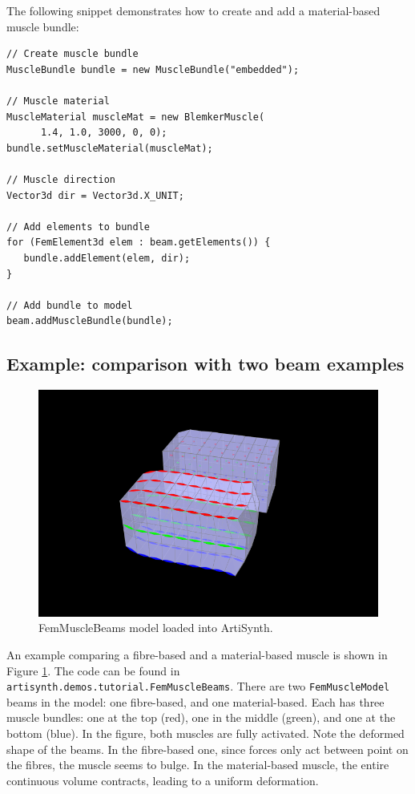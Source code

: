 The following snippet demonstrates how to create and add a material-based
muscle bundle:
\lstset{numbers=left}
\begin{lstlisting}[]
// Create muscle bundle
MuscleBundle bundle = new MuscleBundle("embedded");

// Muscle material
MuscleMaterial muscleMat = new BlemkerMuscle(
      1.4, 1.0, 3000, 0, 0);
bundle.setMuscleMaterial(muscleMat); 

// Muscle direction
Vector3d dir = Vector3d.X_UNIT;

// Add elements to bundle
for (FemElement3d elem : beam.getElements()) {
   bundle.addElement(elem, dir);
}

// Add bundle to model      
beam.addMuscleBundle(bundle);
\end{lstlisting}
\lstset{numbers=none}

\subsection{Example: comparison with two beam examples}

\begin{figure}[ht]
	\centering
	\includegraphics[width=\imglength]{images/FemMuscleBeamsContracted}
	\caption{FemMuscleBeams model loaded into ArtiSynth.}
	\label{fig:fem:musclebeams}
\end{figure}

An example comparing a fibre-based and a material-based muscle is shown 
in Figure \ref{fig:fem:musclebeams}.  The code can be found in 
{\tt artisynth.demos.tutorial.FemMuscleBeams}.  There are two 
{\tt FemMuscleModel} beams in the model: one fibre-based, and one 
material-based.  Each has three muscle bundles: one at the top (red),
one in the middle (green), and one at the bottom (blue).  In the figure,
both muscles are fully activated.  Note the deformed shape of the beams.
In the fibre-based one, since forces only act between point on the fibres,
the muscle seems to bulge.  In the material-based muscle, the entire
continuous volume contracts, leading to a uniform deformation.  

